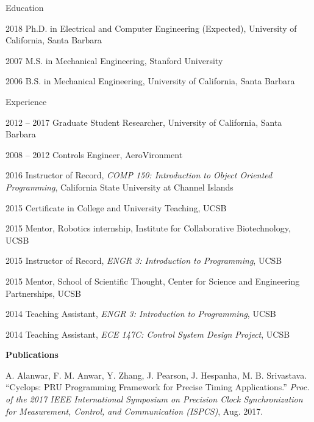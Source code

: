 
\begin{vitaesection}{Education}
\vspace{-0.1cm}
\item [2018]    Ph.D. in Electrical and Computer Engineering (Expected), University of California, Santa Barbara
\item [2007]    M.S. in Mechanical Engineering, Stanford University
\item [2006]    B.S. in Mechanical Engineering, University of California, Santa Barbara
\end{vitaesection}

\begin{vitaesection}{Experience}
\vspace{-0.1cm}
\item [2012 -- 2017] Graduate Student Researcher, University of California, Santa Barbara
\item [2008 -- 2012] Controls Engineer, AeroVironment
\item [2016] Instructor of Record, {\it COMP 150: Introduction to Object Oriented Programming}, California State University at Channel Islands
\item [2015] Certificate in College and University Teaching, UCSB
\item [2015] Mentor, Robotics internship, Institute for Collaborative Biotechnology, UCSB
\item [2015] Instructor of Record, {\it ENGR 3: Introduction to Programming}, UCSB
\item [2015] Mentor, School of Scientific Thought, Center for Science and Engineering Partnerships, UCSB
\item [2014] Teaching Assistant, {\it ENGR 3: Introduction to Programming}, UCSB
\item [2014] Teaching Assistant, {\it ECE 147C: Control System Design Project}, UCSB
\end{vitaesection}


\textbf{Publications}

\vspace{-0.1cm}


\vspace{0.1cm}

A. Alanwar, F. M. Anwar, Y. Zhang, J. Pearson, J. Hespanha, M. B. Srivastava. ``Cyclops: PRU Programming Framework for Precise Timing Applications.'' {\it Proc. of the 2017 IEEE International Symposium on Precision Clock Synchronization for Measurement, Control, and Communication (ISPCS)}, Aug. 2017. 

